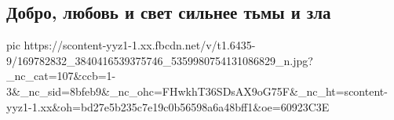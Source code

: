  
 
 
 
 

\subsection{Добро, любовь и свет сильнее тьмы и зла}
\label{sec:06_04_2021.fb.freedom_vlad.1.vaccinacia}

\ifcmt
  pic https://scontent-yyz1-1.xx.fbcdn.net/v/t1.6435-9/169782832_3840416539375746_5359980754131086829_n.jpg?_nc_cat=107&ccb=1-3&_nc_sid=8bfeb9&_nc_ohc=FHwkhT36SDsAX9oG75F&_nc_ht=scontent-yyz1-1.xx&oh=bd27e5b235c7e19c0b56598a6a48bff1&oe=60923C3E
\fi

